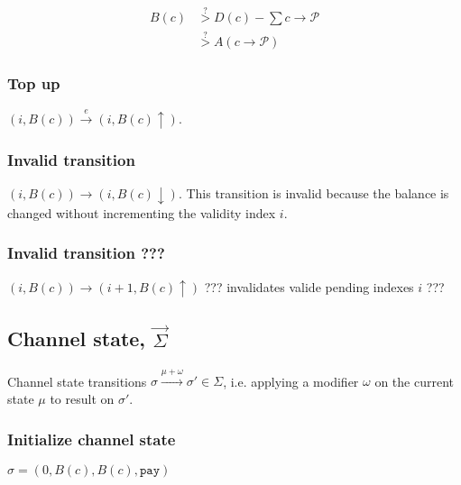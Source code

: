 \documentclass{llncs}
\begin{document}
\begin{equation*}
\begin{split}
    B(c) &\overset{?}{>} D(c) - \textstyle \sum c \rightarrow \mathcal{P} \\
    &\overset{?}{>} A(c \rightarrow \mathcal{P})
\end{split}
\end{equation*}

\subsubsection{Top up} $(i, B(c)) \xrightarrow{e} (i, B(c)\uparrow)$.

\subsubsection{Invalid transition} $(i, B(c)) \rightarrow (i, B(c)\downarrow)$. This transition is invalid because the balance is changed without incrementing the validity index $i$.

\subsubsection{Invalid transition ???} $(i, B(c)) \rightarrow (i+1, B(c)\uparrow)$ ??? invalidates valide pending indexes $i$ ???

\subsection{Channel state, $\overrightarrow{\Sigma}$} Channel state transitions $\sigma \xrightarrow{\mu + \omega} \sigma' \in \Sigma$, i.e. applying a modifier $\omega$ on the current state $\mu$ to result on $\sigma'$.

\subsubsection{Initialize channel state} $\sigma = (0, B(c), B(c), \texttt{pay})$


\end{document}
